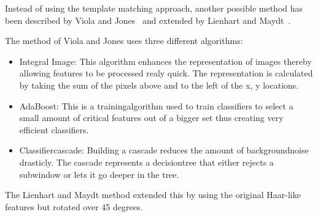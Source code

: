 \documentclass{article}
\begin{document}
Instead of using the template matching approach, another possible method has been described by Viola and Jones~\cite{viola2001rapid} and extended by Lienhart and Maydt~\cite{lienhart2002extended}.
\par
The method of Viola and Jones uses three different algorithms:
\begin{itemize}
\item Integral Image: This algorithm enhances the representation of images thereby allowing features to be processed realy quick. The representation is calculated by taking the sum of the pixels above and to the left of the x, y locations.
\item AdaBoost: This is a trainingalgorithm used to train classifiers to select a small amount of critical features out of a bigger set thus creating very efficient classifiers.
\item Classifiercascade: Building a cascade reduces the amount of backgroundnoise drasticly. The cascade represents a decisiontree that either rejects a subwindow or lets it go deeper in the tree.
\end{itemize}
The Lienhart and Maydt method extended this by using the original Haar-like features but rotated over 45 degrees.
\end{document}
